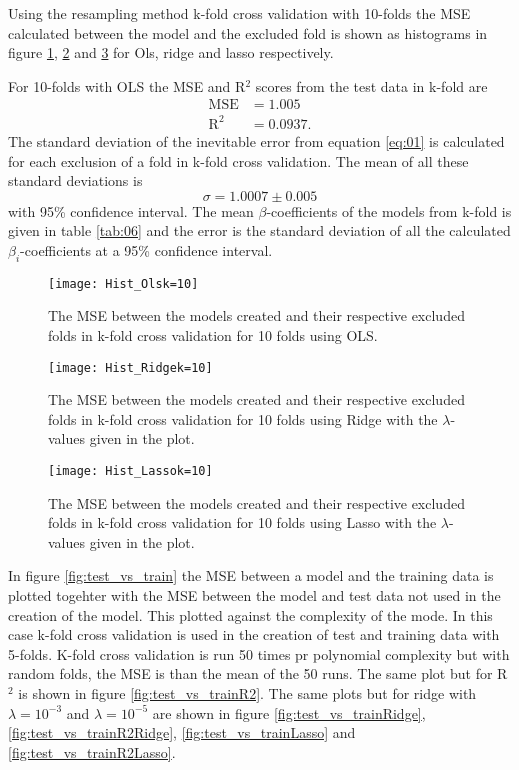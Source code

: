 \documentclass[uio,jmp,amsmath,amssymb,reprint,nofootinbib]{revtex4-1}
\numberwithin{equation}{section}
\begin{document}
Using the resampling method k-fold cross validation with 10-folds the MSE calculated between the model and the excluded fold is shown as histograms in figure \ref{fig:K_fold10_OLS}, \ref{fig:K_fold10_Ridge} and \ref{fig:K_fold10_Lasso} for Ols, ridge and lasso respectively.

For 10-folds with OLS the MSE and R\(^2\) scores from the test data in k-fold are
\begin{align*}
\text{MSE} &= 1.005\\
\text{R}^2 &= 0.0937.
\end{align*}
The standard deviation of the inevitable error from equation \ref{eq:01} is calculated for each exclusion of a fold in k-fold cross validation. The mean of all these standard deviations is
\begin{equation}
\sigma = 1.0007 \pm 0.005
\end{equation}
with 95\% confidence interval. The mean \(\beta\)-coefficients of the models from k-fold is given in table \ref{tab:06} and the error is the standard deviation of all the calculated \(\beta_i\)-coefficients at a 95\% confidence interval. 

\begin{figure}[H]
    \centering
    \texttt{[image: Hist\_Olsk=10]}
    \caption{The MSE between the models created and their respective excluded folds in k-fold cross validation for 10 folds using OLS.}
    \label{fig:K_fold10_OLS}
\end{figure}

\begin{figure}[H]
    \centering
    \texttt{[image: Hist\_Ridgek=10]}
    \caption{The MSE between the models created and their respective excluded folds in k-fold cross validation for 10 folds using Ridge with the \(\lambda\)-values given in the plot.}
    \label{fig:K_fold10_Ridge}
\end{figure}

\begin{figure}[H]
    \centering
    \texttt{[image: Hist\_Lassok=10]}
    \caption{The MSE between the models created and their respective excluded folds in k-fold cross validation for 10 folds using Lasso with the \(\lambda\)-values given in the plot.}
    \label{fig:K_fold10_Lasso}
\end{figure}

In figure \ref{fig:test_vs_train} the MSE between a model and the training data is plotted togehter with the MSE between the model and test data not used in the creation of the model. This plotted against the complexity of the mode. In this case k-fold cross validation is used in the creation of test and training data with 5-folds. K-fold cross validation is run 50 times pr polynomial complexity but with random folds, the MSE is than the mean of the 50 runs. The same plot but for R\(^2\) is shown in figure \ref{fig:test_vs_trainR2}. The same plots but for ridge with \(\lambda = 10^{-3}\) and \(\lambda = 10^{-5}\) are shown in figure \ref{fig:test_vs_trainRidge}, \ref{fig:test_vs_trainR2Ridge}, \ref{fig:test_vs_trainLasso} and \ref{fig:test_vs_trainR2Lasso}.
\end{document}
